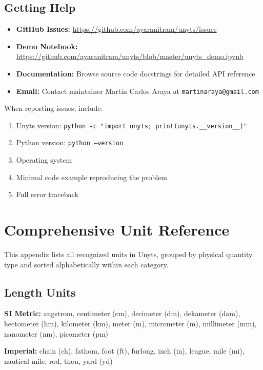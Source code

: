 \documentclass[11pt,a4paper]{report}
\begin{document}
\section{Getting Help}

\begin{itemize}
\item \textbf{GitHub Issues:} \url{https://github.com/ayaranitram/unyts/issues}
\item \textbf{Demo Notebook:} \url{https://github.com/ayaranitram/unyts/blob/master/unyts_demo.ipynb}
\item \textbf{Documentation:} Browse source code docstrings for detailed API reference
\item \textbf{Email:} Contact maintainer Martín Carlos Araya at \texttt{martinaraya@gmail.com}
\end{itemize}

When reporting issues, include:
\begin{enumerate}
\item Unyts version: \texttt{python -c "import unyts; print(unyts.\_\_version\_\_)"}
\item Python version: \texttt{python --version}
\item Operating system
\item Minimal code example reproducing the problem
\item Full error traceback
\end{enumerate}


\appendix

\chapter{Comprehensive Unit Reference}

This appendix lists all recognized units in Unyts, grouped by physical quantity type and sorted alphabetically within each category.

\section{Length Units}

\textbf{SI Metric:} angstrom, centimeter (cm), decimeter (dm), dekameter (dam), hectometer (hm), kilometer (km), meter (m), micrometer (\textmu m), millimeter (mm), nanometer (nm), picometer (pm)

\textbf{Imperial:} chain (ch), fathom, foot (ft), furlong, inch (in), league, mile (mi), nautical mile, rod, thou, yard (yd)
\end{document}
